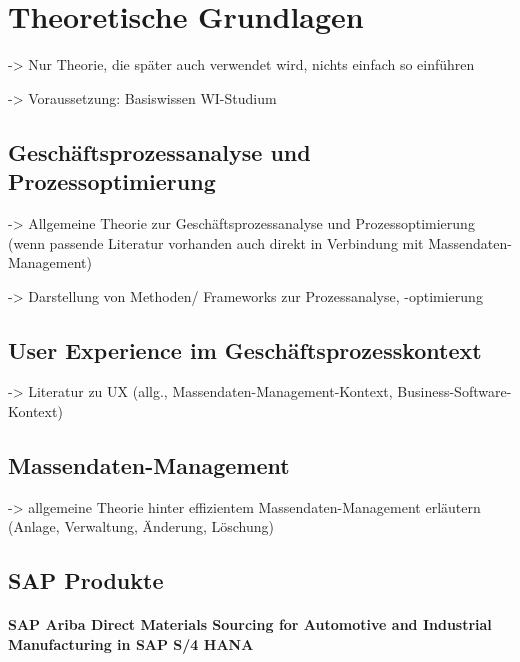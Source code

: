 \chapter{Theoretische Grundlagen}

-> Nur Theorie, die später auch verwendet wird, nichts einfach so einführen

-> Voraussetzung: Basiswissen WI-Studium

\section{Geschäftsprozessanalyse und Prozessoptimierung}

-> Allgemeine Theorie zur Geschäftsprozessanalyse und Prozessoptimierung (wenn passende Literatur vorhanden auch direkt in Verbindung mit Massendaten-Management)

-> Darstellung von Methoden/ Frameworks zur Prozessanalyse, -optimierung

\section{User Experience im Geschäftsprozesskontext}

-> Literatur zu UX (allg., Massendaten-Management-Kontext, Business-Software-Kontext)

\section{Massendaten-Management}

-> allgemeine Theorie hinter effizientem Massendaten-Management erläutern (Anlage, Verwaltung, Änderung, Löschung)

\section{SAP Produkte}

\subsubsection{SAP Ariba Direct Materials Sourcing for Automotive and Industrial Manufacturing in SAP S/4 HANA}

